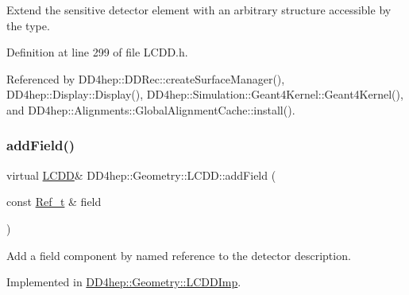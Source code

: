 Extend the sensitive detector element with an arbitrary structure accessible by the type. 



Definition at line 299 of file L\+C\+D\+D.\+h.



Referenced by D\+D4hep\+::\+D\+D\+Rec\+::create\+Surface\+Manager(), D\+D4hep\+::\+Display\+::\+Display(), D\+D4hep\+::\+Simulation\+::\+Geant4\+Kernel\+::\+Geant4\+Kernel(), and D\+D4hep\+::\+Alignments\+::\+Global\+Alignment\+Cache\+::install().

\hypertarget{class_d_d4hep_1_1_geometry_1_1_l_c_d_d_a91ae6cfee73a663c46f296bc403b5c63}{}\label{class_d_d4hep_1_1_geometry_1_1_l_c_d_d_a91ae6cfee73a663c46f296bc403b5c63} 
\subsubsection{\texorpdfstring{add\+Field()}{addField()}}
{\footnotesize\ttfamily virtual \hyperlink{class_d_d4hep_1_1_geometry_1_1_l_c_d_d}{L\+C\+DD}\& D\+D4hep\+::\+Geometry\+::\+L\+C\+D\+D\+::add\+Field (\begin{DoxyParamCaption}\item[{const \hyperlink{group___d_d4_h_e_p___g_e_o_m_e_t_r_y_ga40af83be6718bb8828a3d83dc7f8c930}{Ref\+\_\+t} \&}]{field }\end{DoxyParamCaption})\hspace{0.3cm}{\ttfamily [pure virtual]}}



Add a field component by named reference to the detector description. 



Implemented in \hyperlink{class_d_d4hep_1_1_geometry_1_1_l_c_d_d_imp_a94f5aafcc5fc95d0b15feb960f244019}{D\+D4hep\+::\+Geometry\+::\+L\+C\+D\+D\+Imp}.

\hypertarget{class_d_d4hep_1_1_geometry_1_1_l_c_d_d_a93f80b4976e72a8a64d73baa6cf50a4d}{}\label{class_d_d4hep_1_1_geometry_1_1_l_c_d_d_a93f80b4976e72a8a64d73baa6cf50a4d} 

